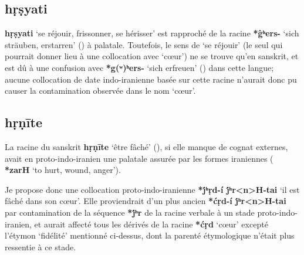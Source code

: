 \documentclass{article}
\newcommand{\ipa}[1]{{\phon\textbf{#1}}}
\begin{document}
\subsection{\ipa{hṛṣyati}}
\ipa{hṛṣyati} `se réjouir, frissonner, se hérisser' est rapproché de la racine \ipa{*ĝʰers-} `sich sträuben, erstarren' (\citealt[178]{liv}) à palatale. Toutefois,  le sens de `se réjouir' (le seul qui pourrait donner lieu à une collocation avec `cœur') ne se trouve qu'en sanskrit, et est dû à une confusion avec \ipa{*g(ʷ)ʰers-} `sich erfreuen' (\citealt[198]{liv}) dans cette langue; aucune collocation de date indo-iranienne basée sur cette racine n'aurait donc pu causer la contamination observée dans le nom `cœur'.


\subsection{\ipa{hṛṇīte}}
La racine du sanskrit \ipa{hṛṇīte} `être fâché' (\citealt[178]{liv}), si elle manque de cognat externes, avait en proto-indo-iranien une palatale assurée par les formes iraniennes (\citealt[469]{cheung07dictionary} \ipa{*zarH} ‘to hurt, wound, anger’).

Je propose donc une collocation proto-indo-iranienne \ipa{*j́ʰṛd-í j́ʰr<n>H-tai} `il est fâché dans son cœur'. Elle proviendrait d'un plus ancien \ipa{*ćṛd-í j́ʰr<n>H-tai} par contamination de la séquence \ipa{*j́ʰr} de la racine verbale à un stade proto-indo-iranien, et aurait affecté tous les dérivés de la racine \ipa{*ćṛd} `cœur' excepté l'étymon `fidélité' mentionné ci-dessus, dont la parenté étymologique n'était plus ressentie à ce stade.



\end{document}
